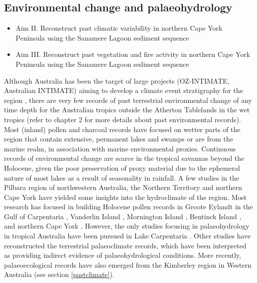 \documentclass[
  12pt,
]{book}
\begin{document}
\hypertarget{environmental-change-and-palaeohydrology}{%
\subsection{Environmental change and palaeohydrology}\label{environmental-change-and-palaeohydrology}}

\begin{itemize}
\item
  Aim II. Reconstruct past climatic variability in northern Cape York Peninsula using the Sanamere Lagoon sediment sequence
\item
  Aim III. Reconstruct past vegetation and fire activity in northern Cape York Peninsula using the Sanamere Lagoon sediment sequence
\end{itemize}

Although Australia has been the target of large projects (OZ-INTIMATE, Australian INTIMATE) aiming to develop a climate event stratigraphy for the region \citep{reevesPalaeoenvironmentalChangeTropical2013}, there are very few records of past terrestrial environmental change of any time depth for the Australian tropics outside the Atherton Tablelands in the wet tropics (refer to chapter 2 for more details about past environmental records). Most (inland) pollen and charcoal records have focused on wetter parts of the region that contain extensive, permanent lakes and swamps or are from the marine realm, in association with marine environmental proxies. Continuous records of environmental change are scarce in the tropical savannas beyond the Holocene, given the poor preservation of proxy material due to the ephemeral nature of most lakes as a result of seasonality in rainfall. A few studies in the Pilbara region of northwestern Australia, the Northern Territory and northern Cape York have yielded some insights into the hydroclimate of the region. Most research has focused in building Holocene pollen records in Groote Eylandt in the Gulf of Carpentaria \citep{shulmeisterHolocenePollenRecord1992, shulmeisterMorphologyChronostratigraphyCoastal1992, shulmeisterAustralasianEvidenceMidholocene1999}, Vanderlin Island \citep{prebbleHolocenePollenDiatom2005}, Mornington Island \citep{mossEnvironmentalContextLate2015}, Bentinck Island \citep{mackenzieGeochemicalInvestigationSouth2017}, and northern Cape York \citep{rowePalynologicalInvestigationHolocene2007, roweLateHoloceneSwamp2015}. However, the only studies focusing in palaeohydrology in tropical Australia have been pursued in Lake Carpentaria \citep{jonesLateQuaternaryEvolution1988, mccullochStrontiumIsotopeVariations1989a, reevesPalaeoenvironmentalChangeGulf2007, reevesSedimentaryRecordPalaeoenvironments2008, torgersenLateQuaternaryHydrological1985a, devriendtLateQuaternaryEnvironment2011}. Other studies have reconstructed the terrestrial palaeoclimate records, which have been interpreted as providing indirect evidence of palaeohydrological conditions. More recently, palaeoecological records have also emerged from the Kimberley region in Western Australia \citep{fieldLateQuaternaryRecord2017, dennistonStalagmiteRecordHolocene2013} (see section \ref{pastclimate}).
\end{document}
